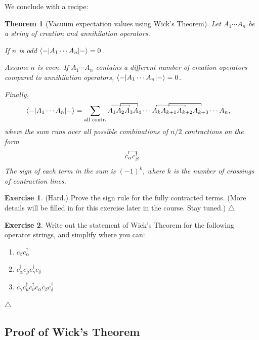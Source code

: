 \documentclass{report}
\theoremstyle{plain}
\newtheorem{theorem}{Theorem}[chapter]
\theoremstyle{definition}
\newtheorem{exerc}{Exercise}[chapter]
\newcommand\xqed[1]{%
  \leavevmode\unskip\penalty9999 \hbox{}\nobreak\hfill
  \quad\hbox{#1}}
\newcommand\demo{\xqed{$\triangle$}}
\newenvironment{exercise}{\bigskip\begin{exerc}}{\demo\end{exerc}\bigskip}
\begin{document}
We conclude with a recipe:
\begin{theorem}[Vacuum expectation values using Wick's Theorem]
  Let $A_1\cdots A_n$ be a string of creation and annihilation
  operators.

  If $n$ is odd $\braket{-|A_1\cdots A_n|-} = 0$.

  Assume $n$ is even. If $A_1\cdots A_n$ contains a different number
  of creation operators compared to annihilation operators,
  $\braket{-|A_1\cdots A_n|-}=0$.

  Finally,
\begin{equation}
  \begin{split}
    \braket{-|A_1\cdots A_n|-} 
    &= \sum_\text{all contr.} \contraction[0.5ex]{}{A_1}{A_2}{A_3}\contraction[1.0ex]{A_1}{A_2}{A_3}{A_4}
      A_1 A_2 A_3 A_4 \cdots
      \contraction[0.5ex]{}{A_k}{A_{k+1}}{A_{k+2}}\contraction[1.0ex]{A_k}{A_{k+1}}{A_{k+2}}{A_{k+3}}
      A_k A_{k+1} A_{k+2} A_{k+3} \cdots A_n, \label{eq:even-vacuum-wick}
  \end{split}
\end{equation}
where the sum runs over all possible combinations of $n/2$ contractions on the form 
\[ \contraction{}{\an{\alpha}}{}{\cre{\beta}}
\an{\alpha}\cre{\beta} \]
The sign of each term in the sum is $(-1)^k$, where $k$ is the number of
crossings of contraction lines.
\end{theorem}

\begin{exercise} (Hard.)  Prove the sign rule for the fully contracted
  terms. (More details will be filled in for this exercise later in
  the course. Stay tuned.)
\end{exercise}

\begin{exercise}
  Write out the statement of Wick's Theorem for the following
  operator strings, and simplify where you can:
  \begin{enumerate}
  \item
    $ c_\beta c^\dag_\alpha $
  \item
    $ c^\dag_\alpha c_\beta c^\dag_\gamma c_\delta $
  \item
    $ c_\gamma c^\dag_{\mu} c^\dag_\nu c_\alpha c_\beta c^\dag_\delta$
  \end{enumerate}
\end{exercise}







\subsection{Proof of Wick's Theorem}
\end{document}
